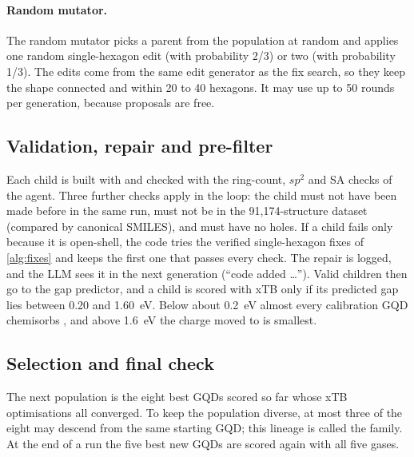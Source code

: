 \paragraph{Random mutator.} The random mutator picks a parent from the population at random and
applies one random single-hexagon edit (with probability 2/3) or two (with probability 1/3).
The edits come from the same edit generator as the fix search, so they keep the shape connected
and within 20 to 40 hexagons. It may use up to 50 rounds per generation, because proposals are
free.

\subsection{Validation, repair and pre-filter}

Each child is built with  and checked with the ring-count, \(sp^2\) and SA
checks of the agent. Three further checks apply in the loop: the child must not have been made
before in the same run, must not be in the 91{,}174-structure dataset (compared by canonical
SMILES), and must have no holes. If a child fails only because it is open-shell, the code tries
the verified single-hexagon fixes of \cref{alg:fixes} and keeps the first one that passes every
check. The repair is logged, and the LLM sees it in the next generation (``code added \ldots'').
Valid children then go to the gap predictor, and a child is scored with xTB only if its predicted
gap lies between 0.20 and 1.60~eV. Below about 0.2~eV almost every calibration GQD chemisorbs
, and above 1.6~eV the charge moved to  is smallest.

\subsection{Selection and final check}

The next population is the eight best GQDs scored so far whose xTB optimisations all converged.
To keep the population diverse, at most three of the eight may descend from the same starting
GQD; this lineage is called the family. At the end of a run the five best new GQDs are scored again
with all five gases.

